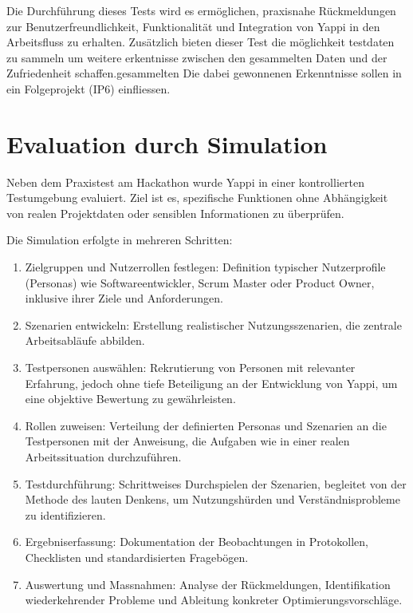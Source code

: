 \documentclass[12pt,a4paper]{report}
\begin{document}
 Die Durchführung dieses Tests wird es ermöglichen, praxisnahe Rückmeldungen zur Benutzerfreundlichkeit, Funktionalität
 und Integration von Yappi in den Arbeitsfluss zu erhalten. Zusätzlich bieten dieser Test die möglichkeit testdaten zu
 sammeln um weitere erkentnisse zwischen den gesammelten Daten und der Zufriedenheit schaffen.gesammelten Die dabei
 gewonnenen Erkenntnisse sollen in ein Folgeprojekt (IP6) einfliessen.

\section{Evaluation durch Simulation}

Neben dem Praxistest am Hackathon wurde Yappi in einer kontrollierten Testumgebung evaluiert. Ziel ist es, spezifische
Funktionen ohne Abhängigkeit von realen Projektdaten oder sensiblen Informationen zu überprüfen.

Die Simulation erfolgte in mehreren Schritten:
\begin{enumerate}
    \item Zielgruppen und Nutzerrollen festlegen: Definition typischer Nutzerprofile (Personas) wie Softwareentwickler,
    Scrum Master oder Product Owner, inklusive ihrer Ziele und Anforderungen.
    \item Szenarien entwickeln: Erstellung realistischer Nutzungsszenarien, die zentrale Arbeitsabläufe abbilden.
    \item Testpersonen auswählen: Rekrutierung von Personen mit relevanter Erfahrung, jedoch ohne tiefe
    Beteiligung an der Entwicklung von Yappi, um eine objektive Bewertung zu gewährleisten.
    \item Rollen zuweisen: Verteilung der definierten Personas und Szenarien an die Testpersonen mit der Anweisung,
    die Aufgaben wie in einer realen Arbeitssituation durchzuführen.
    \item Testdurchführung: Schrittweises Durchspielen der Szenarien, begleitet von der Methode des lauten Denkens,
    um Nutzungshürden und Verständnisprobleme zu identifizieren.
    \item Ergebniserfassung: Dokumentation der Beobachtungen in Protokollen, Checklisten und standardisierten
    Fragebögen.
    \item Auswertung und Massnahmen: Analyse der Rückmeldungen, Identifikation wiederkehrender Probleme und Ableitung
    konkreter Optimierungsvorschläge.
\end{enumerate}
\end{document}
